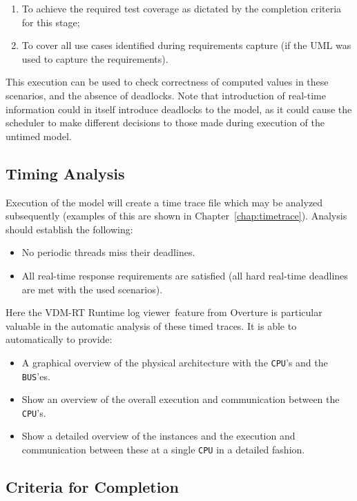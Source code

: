 \documentclass{overturerepchap}
\newcommand{\showtrace}{VDM-RT Runtime log viewer}
\begin{document}
\begin{enumerate}
\item To achieve the required test coverage as dictated by the
completion criteria for this stage;
\item To cover all use cases identified during requirements capture
(if the UML was used to capture the requirements).
\end{enumerate}

This execution can be used to check correctness of computed values in
these scenarios, and the absence of deadlocks. Note that introduction
of real-time information could in itself introduce deadlocks to the
model, as it could cause the scheduler to make different decisions to
those made during execution of the untimed model.

\subsection{Timing Analysis}

Execution of the model will create a time trace file which
may be analyzed subsequently (examples of this are shown in
Chapter~\ref{chap:timetrace}). Analysis should establish the
following:

\begin{itemize}
\item No periodic threads miss their deadlines.
\item All real-time response requirements are satisfied (all hard 
      real-time deadlines are met with the used scenarios).
\end{itemize}

Here the \showtrace\ feature from Overture is particular valuable 
in the automatic analysis of these timed traces. It is able to automatically
to provide:
\begin{itemize}
\item A graphical overview of the physical architecture with the \texttt{CPU}'s
      and the \texttt{BUS}'es.
\item Show an overview of the overall execution and communication between
      the \texttt{CPU}'s.
\item Show a detailed overview of the instances and the execution and 
      communication between these at a single \texttt{CPU} in a detailed
      fashion.
\end{itemize}

\subsection{Criteria for Completion}
\end{document}

